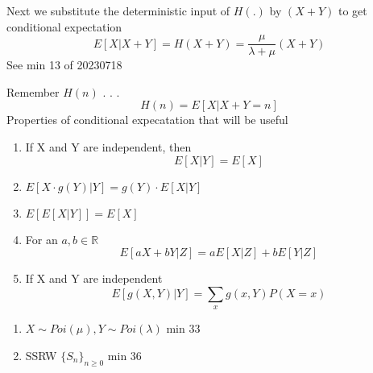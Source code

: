 \documentclass{report}
\begin{document}
    Next we substitute the deterministic input of $H(.)$ by $(X+Y)$ to get conditional expectation
            \[ E[X|X+Y] = H(X+Y) = \frac{\mu}{\lambda + \mu} (X+Y) \]
    See min 13 of 20230718

    Remember $H(n)$ . . .
      \[ H(n) = E[X|X+Y=n] \]
    Properties of conditional expecatation that will be useful
    \begin{enumerate}
      \item If X and Y are independent, then
        \[ E[X|Y] = E[X] \]
      \item $E[X \cdot g(Y)|Y] = g(Y) \cdot E[X|Y]$
      \item $E[E[X|Y]] = E[X]$
      \item For an $a,b \in \mathbb{R}$
        \[ E[aX+bY|Z] = aE[X|Z] + bE[Y|Z] \]
      \item If X and Y are independent
        \[ E[g(X,Y)|Y] = \sum_{x} g(x,Y)P(X=x) \]
    \end{enumerate}
    \ex{} {
      \begin{enumerate}
        \item $X \sim Poi(\mu), Y \sim Poi(\lambda)$ min 33
        \item SSRW $\{S_n\}_{n \geq 0}$ min 36
      \end{enumerate}
    }
\end{document}
